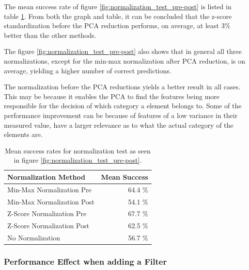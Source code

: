 The mean success rate of figure \ref{fig:normalization_test_pre-post} is listed in table \ref{tab:meanSuccess_normalization_test_pre-post}.
From both the graph and table, it can be concluded that the z-score standardization before the PCA reduction performs, on average, at least 3\% better than the other methods.

The figure \ref{fig:normalization_test_pre-post} also shows that in general all three normalizations, except for the min-max normalization after PCA reduction, is on average, yielding a higher number of correct predictions.

The normalization before the PCA reductions yields a better result in all cases. 
This may be because it enables the PCA to find the features being more responsible for the decision of which category a element belongs to. 
Some of the performance improvement can be because of features of a low variance in their measured value, have a larger relevance as to what the actual category of the elements are.

\begin{table}[H]
\centering
\begin{tabular}{|l|r|}\hline
Normalization Method & Mean Success \\ \hline
Min-Max Normalization Pre & 64.4 \% \\ \hline
Min-Max Normalization Post & 54.1 \% \\ \hline
Z-Score Normalization Pre & 67.7 \% \\ \hline
Z-Score Normalization Post & 62.5  \% \\ \hline
No Normalization & 56.7 \% \\ \hline
\end{tabular}
\caption{Mean success rates for normalization test as seen in figure \ref{fig:normalization_test_pre-post}.}
\label{tab:meanSuccess_normalization_test_pre-post}
\end{table}



\subsubsection{Performance Effect when adding a Filter}

